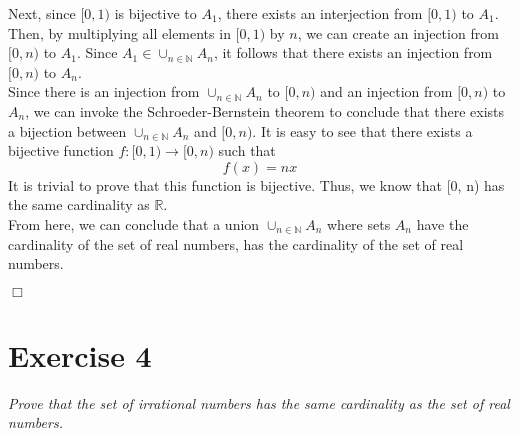 \documentclass[
]{article}
\begin{document}
\hspace*{0.333em}\hspace*{0.333em}\hspace*{0.333em}\hspace*{0.333em}Next,
since \([0, 1)\) is bijective to \(A_1\), there exists an interjection
from \([0, 1)\) to \(A_1\). Then, by multiplying all elements in
\([0, 1)\) by \(n\), we can create an injection from \([0, n)\) to
\(A_1\). Since \(A_1 \in \cup _{n \in \mathbb{N}}A_n\), it follows that
there exists an injection from \([0, n)\) to \(A_n\).\\
\hspace*{0.333em}\hspace*{0.333em}\hspace*{0.333em}\hspace*{0.333em}Since
there is an injection from \(\cup _{n \in \mathbb{N}}A_n\) to \([0, n)\)
and an injection from \([0, n)\) to \(A_n\), we can invoke the
Schroeder-Bernstein theorem to conclude that there exists a bijection
between \(\cup _{n \in \mathbb{N}}A_n\) and \([0, n)\). It is easy to
see that there exists a bijective function \(f: [0, 1) \to [0, n)\) such
that \[f(x) = nx\] It is trivial to prove that this function is
bijective. Thus, we know that {[}0, n) has the same cardinality as
\(\mathbb{R}\).\\
\hspace*{0.333em}\hspace*{0.333em}\hspace*{0.333em}\hspace*{0.333em}From
here, we can conclude that a union \(\cup _{n \in \mathbb{N}} A_n\)
where sets \(A_n\) have the cardinality of the set of real numbers, has
the cardinality of the set of real numbers.

\hfill \(\Box\)

\hypertarget{exercise-4}{%
\section{Exercise 4}\label{exercise-4}}

\emph{Prove that the set of irrational numbers has the same cardinality
as the set of real numbers.}
\end{document}
